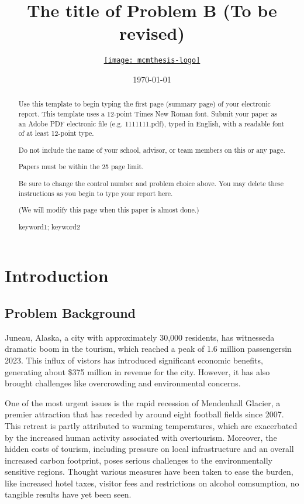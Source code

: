 \documentclass{mcmthesis}
\title{The title of Problem B (To be revised)}
\author{\small \href{https://www.latexstudio.net/}
  {\texttt{[image: mcmthesis-logo]}}}
\date{\today}
\begin{document}
\begin{abstract}
\par 
Use this template to begin typing the first page (summary page) of your electronic report. This template uses a 12-point Times New Roman font. Submit your paper as an Adobe PDF electronic file (e.g. 1111111.pdf), typed in English, with a readable font of at least 12-point type.

Do not include the name of your school, advisor, or team members on this or any page.

Papers must be within the 25 page limit.

Be sure to change the control number and problem choice above.
You may delete these instructions as you begin to type your report here.

(We will modify this page when this paper is almost done.)
\begin{keywords}
keyword1; keyword2
\end{keywords}
\end{abstract}
\maketitle
\tableofcontents
\newpage
\section{Introduction}
\subsection{Problem Background}
Juneau, Alaska, a city with approximately 30,000 residents, has witnesseda dramatic boom in the tourism, which reached a peak of 1.6 million passengersin 2023. 
This influx of vistors has introduced significant economic benefits, generating about \$375 million in revenue for the city. 
However, it has also brought challenges like overcrowding and environmental concerns.

One of the most urgent issues is the rapid recession of Mendenhall Glacier, a premier attraction that has receded by around eight football fields since 2007. 
This retreat is partly attributed to warming temperatures, which are exacerbated by the increased human activity associated with overtourism. 
Moreover, the hidden costs of tourism, including pressure on local infrastructure and an overall increased carbon footprint, poses serious challenges to the environmentally sensitive regions. 
Thought various measures have been taken to ease the burden, like increased hotel taxes, visitor fees and restrictions on alcohol comsumption, no tangible results have yet been seen.
\end{document}
